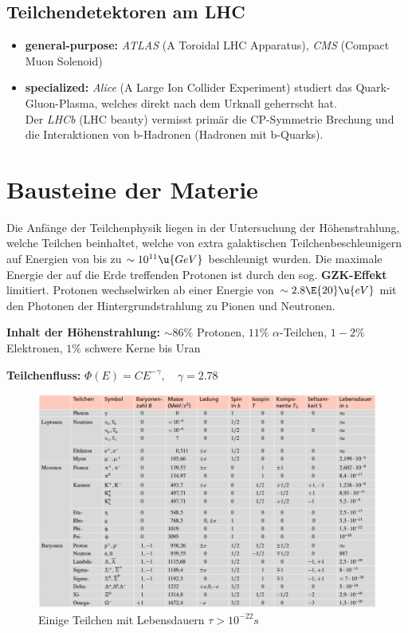 \documentclass[final]{summery_5.0}
\begin{document}
\subsection{Teilchendetektoren am LHC}
\begin{itemize}
    \item  {\bf general-purpose:} \emph{ATLAS} (A Toroidal LHC Apparatus), \emph{CMS} (Compact Muon Solenoid)
    \item  {\bf specialized:} \emph{Alice} (A Large Ion Collider Experiment) studiert das Quark-Gluon-Plasma, welches direkt nach dem Urknall geherrscht hat.\\
    Der \emph{LHCb} (LHC beauty) vermisst primär die CP-Symmetrie Brechung und die Interaktionen von b-Hadronen (Hadronen mit b-Quarks).
\end{itemize}


\section{Bausteine der Materie}
Die Anfänge der Teilchenphysik liegen in der Untersuchung der Höhenstrahlung, welche Teilchen beinhaltet, welche von extra galaktischen Teilchenbeschleunigern auf Energien von bis zu $\sim10^{11}\u{GeV}$ beschleunigt wurden. Die maximale Energie der auf die Erde treffenden Protonen ist durch den sog. {\bf GZK-Effekt} limitiert. Protonen wechselwirken ab einer Energie von $\sim 2.8\E{20}\u{eV}$ mit den Photonen der Hintergrundstrahlung zu Pionen und Neutronen. 
\begin{boxA}
    {\bf Inhalt der Höhenstrahlung: } $\sim 86\%$ Protonen, $11\%$ $\alpha$-Teilchen, $1-2\%$ Elektronen, $1\%$ schwere Kerne bis Uran

    {\bf Teilchenfluss:} $\Phi(E) = C E^{-\gamma},\quad \gamma = 2.78$
\end{boxA}

\begin{figure}[H]
    \centering
    
\end{figure}
\begin{figure}[H]
    \centering
    \includegraphics[width=1.0\textwidth]{teilchen_mit_tau_ge_e-22s.png}
    \caption{Einige Teilchen mit Lebensdauern $\tau >10^{-22}s$}
\end{figure}
\end{document}
